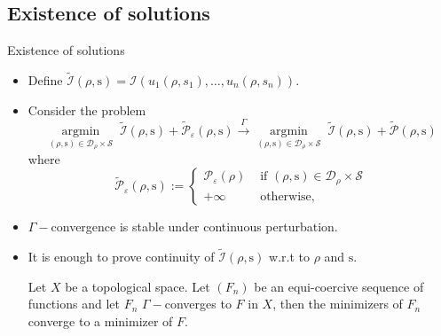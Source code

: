\documentclass{beamer}
\newcommand{\PP}{\mathcal{P}}
\newcommand{\p}{\rho}
\newcommand{\e}{\varepsilon}
\begin{document}
\subsection{Existence of solutions}
\begin{frame}{Existence of solutions}
    \begin{itemize}
        \item Define $\widetilde{\mathcal{I}}(\rho,\mathrm{s}) = \mathcal{I}\left(u_1(\rho,s_1), \dots, u_n(\rho,s_n)\right).$
        \item Consider the problem
        $$\mathop{\arg \min}\limits_{(\p,\mathrm{s}) \in \mathcal{D_\rho} \times \mathcal{S}}\; \widetilde{\mathcal{I}}(\rho,\mathrm{s})+\widetilde{\PP}_{\varepsilon}(\p, \mathrm{s}) \stackrel{\Gamma}{\longrightarrow} \mathop{\arg \min}\limits_{(\p,\mathrm{s}) \in \mathcal{D_\rho} \times \mathcal{S}}\; \widetilde{\mathcal{I}}(\rho,\mathrm{s})+\widetilde{\PP}(\p,\mathrm{s})$$
        where \begin{equation*}
            \widetilde{\mathcal{P}}_\e(\p,\mathrm{s}) := \begin{cases}
                \mathcal{P}_\e(\p) & \text{ if } (\p,\mathrm{s}) \in \mathcal{D}_\p\times\mathcal{S}\\
                +\infty & \text{ otherwise,}
            \end{cases}
        \end{equation*}
        \item $\Gamma-$convergence is stable under continuous perturbation.
        \item It is enough to prove continuity of $\widetilde{\mathcal{I}}(\rho,\mathrm{s})$ w.r.t to $\p$ and $\mathrm{s}.$
        \begin{theorem}
            Let $X$ be a topological space. Let $(F_n)$ be an equi-coercive sequence of functions and let $F_n$ $\Gamma-$converges to
            $F$ in $X$, then the minimizers of $F_n$ converge to a minimizer of $F.$
            
        \end{theorem}
    \end{itemize}
\end{frame}
\end{document}
